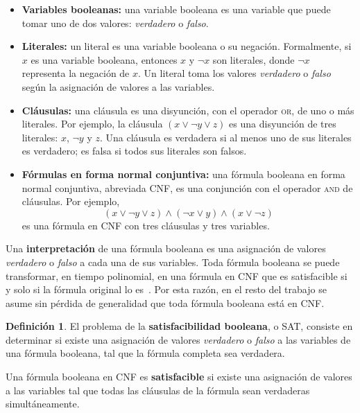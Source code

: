 \documentclass{report}
\theoremstyle{definition}
\newtheorem{definicion}{Definición}[chapter]
\theoremstyle{plain}
\theoremstyle{remark}
\begin{document}
\begin{itemize}
  \item \textbf{Variables booleanas:} una variable booleana es una
    variable que puede tomar uno de dos valores: \textit{verdadero} o
    \textit{falso}.
  \item \textbf{Literales:} un literal es una variable booleana o su
    negación. Formalmente, si $x$ es una variable booleana, entonces
    $x$ y $\neg x$ son literales, donde $\neg x$ representa la
    negación de $x$. Un literal toma los valores \textit{verdadero} o
    \textit{falso} según la asignación de valores a las variables.
  \item \textbf{Cláusulas:} una cláusula es una disyunción, con el
    operador \textsc{or}, de uno o más literales. Por ejemplo, la cláusula
    $(x \vee \neg y \vee z)$ es una disyunción de tres literales: $x$,
    $\neg y$ y $z$. Una cláusula es verdadera si al menos uno de sus
    literales es verdadero; es falsa si todos sus literales son falsos.
  \item \textbf{Fórmulas en forma normal conjuntiva:} una fórmula
    booleana en forma normal conjuntiva, abreviada CNF, es una
    conjunción con el operador \textsc{and} de cláusulas. Por ejemplo,
    \[
      (x \vee \neg y \vee z) \wedge (\neg x \vee y) \wedge
      (x \vee \neg z)
    \]
    es una fórmula en CNF con tres cláusulas y tres variables.
\end{itemize}

Una \textbf{interpretación} de una fórmula booleana es una asignación
de valores \textit{verdadero} o \textit{falso} a cada una de sus
variables. Toda fórmula booleana se puede transformar, en tiempo
polinomial, en una fórmula en CNF que es satisfacible si y solo si la
fórmula original lo es~\cite{hopcroft2006introduction}. Por esta
razón, en el resto del trabajo se asume sin pérdida de generalidad
que toda fórmula booleana está en CNF.

\begin{definicion}
El problema de la \textbf{satisfacibilidad booleana}, o SAT, consiste
en determinar si existe una asignación de valores \textit{verdadero} o
\textit{falso} a las variables de una fórmula booleana, tal que la
fórmula completa sea verdadera.
\end{definicion}

Una fórmula booleana en CNF es \textbf{satisfacible} si existe una
asignación de valores a las variables tal que todas las cláusulas de la
fórmula sean verdaderas simultáneamente.
\end{document}
